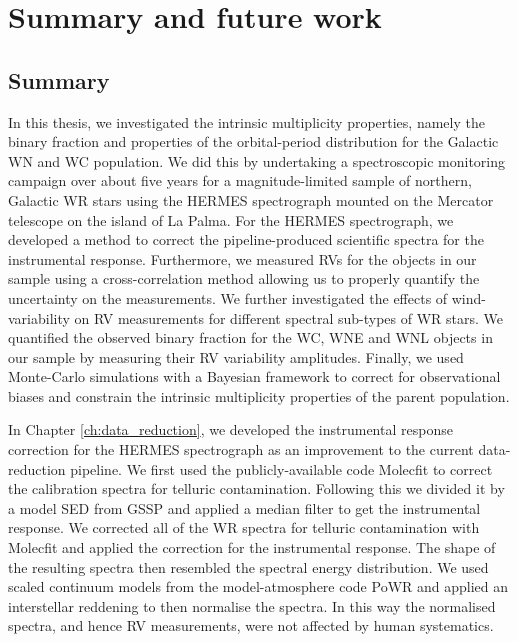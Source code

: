 \chapter{Summary and future work}\label{ch:summary}

\section{Summary}
In this thesis, we investigated the intrinsic multiplicity properties, namely the binary fraction and properties of the orbital-period distribution for the Galactic WN and WC population. We did this by undertaking a spectroscopic monitoring campaign over about five years for a magnitude-limited sample of northern, Galactic WR stars using the HERMES spectrograph mounted on the Mercator telescope on the island of La Palma. For the HERMES spectrograph, we developed a method to correct the pipeline-produced scientific spectra for the instrumental response. Furthermore, we measured RVs for the objects in our sample using a cross-correlation method allowing us to properly quantify the uncertainty on the measurements. We further investigated the effects of wind-variability on RV measurements for different spectral sub-types of WR stars. We quantified the observed binary fraction for the WC, WNE and WNL objects in our sample by measuring their RV variability amplitudes. Finally, we used Monte-Carlo simulations with a Bayesian framework to correct for observational biases and constrain the intrinsic multiplicity properties of the parent population.

In Chapter \ref{ch:data_reduction}, we developed the instrumental response correction for the HERMES spectrograph as an improvement to the current data-reduction pipeline. We first used the publicly-available code Molecfit to correct the calibration spectra for telluric contamination. Following this we divided it by a model SED from GSSP and applied a median filter to get the instrumental response. We corrected all of the WR spectra for telluric contamination with Molecfit and applied the correction for the instrumental response. The shape of the resulting spectra then resembled the spectral energy distribution. We used scaled continuum models from the model-atmosphere code PoWR and applied an interstellar reddening to then normalise the spectra. In this way the normalised spectra, and hence RV measurements, were not affected by human systematics.

